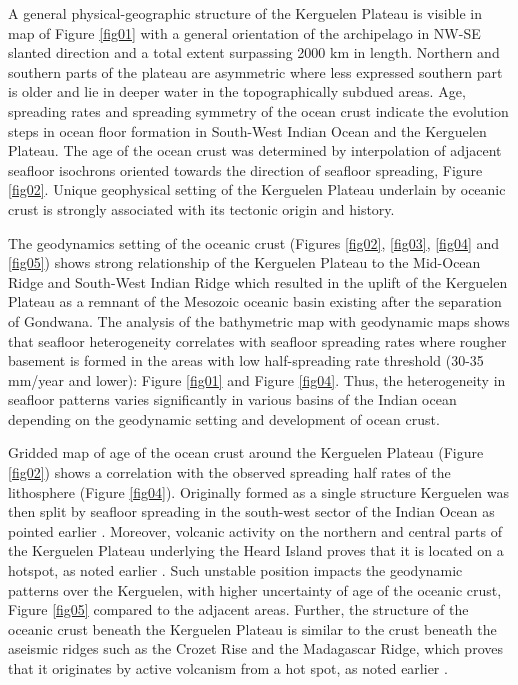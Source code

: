\documentclass[geomatics,article,submit,pdftex,moreauthors]{Definitions/mdpi}
\begin{document}
A general physical-geographic structure of the Kerguelen Plateau is visible in map of Figure \ref{fig01} with a general orientation of the archipelago in NW-SE slanted direction and a total extent surpassing 2000 km in length. Northern and southern parts of the plateau are asymmetric where less expressed southern part is older and lie in deeper water in the topographically subdued areas. Age, spreading rates and spreading symmetry of the ocean crust indicate the evolution steps in ocean floor formation in South-West Indian Ocean and the Kerguelen Plateau. The age of the ocean crust was determined by interpolation of adjacent seafloor isochrons oriented towards the direction of seafloor spreading, Figure \ref{fig02}. Unique geophysical setting of the Kerguelen Plateau underlain by oceanic crust is strongly associated with its tectonic origin and history. 

The geodynamics setting of the oceanic crust (Figures \ref{fig02}, \ref{fig03}, \ref{fig04} and \ref{fig05}) shows strong relationship of the Kerguelen Plateau to the Mid-Ocean Ridge and South-West Indian Ridge which resulted in the uplift of the Kerguelen Plateau as a remnant of the Mesozoic oceanic basin existing after the separation of Gondwana. The analysis of the bathymetric map with geodynamic maps shows that seafloor heterogeneity correlates with seafloor spreading rates where rougher basement is formed in the areas with low half-spreading rate threshold (30-35 mm/year and lower): Figure \ref{fig01} and Figure \ref{fig04}. Thus, the heterogeneity in seafloor patterns varies significantly in various basins of the Indian ocean depending on the geodynamic setting and development of ocean crust.

Gridded map of age of the ocean crust around the Kerguelen Plateau (Figure \ref{fig02}) shows a correlation with the observed spreading half rates of the lithosphere (Figure \ref{fig04}). Originally formed as a single structure Kerguelen was then split by seafloor spreading in the south-west sector of the Indian Ocean as pointed earlier \cite{BRADLEY1988243}. Moreover, volcanic activity on the northern and central parts of the Kerguelen Plateau  underlying the Heard Island proves that it is located on a hotspot, as noted earlier \cite{Duncan2016,Plenier,HOUTZ197795}. Such unstable position impacts the geodynamic patterns over the Kerguelen, with higher uncertainty of age of the oceanic crust, Figure \ref{fig05} compared to the adjacent areas. Further, the structure of the oceanic crust beneath the Kerguelen Plateau is similar to the crust beneath the aseismic ridges such as the Crozet Rise and the Madagascar Ridge, which proves that it originates by active volcanism from a hot spot, as noted earlier \cite{Recq}.
\end{document}
